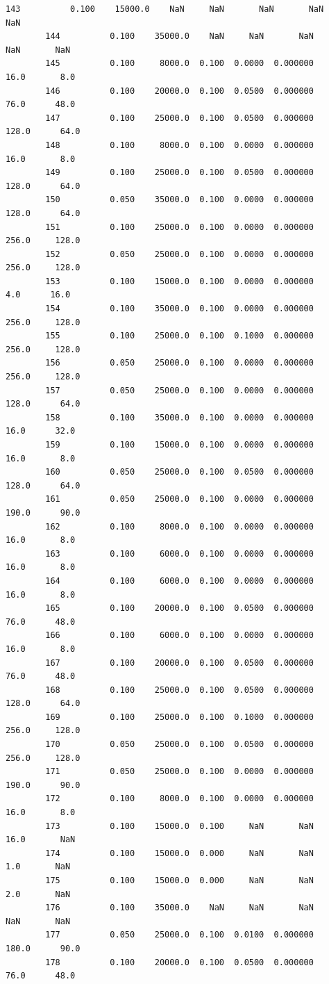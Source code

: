 \documentclass[11pt, a4paper , landscape]{article}
\begin{document}
\begin{Verbatim}[commandchars=\\\{\}]
        143          0.100    15000.0    NaN     NaN       NaN       NaN       NaN   
        144          0.100    35000.0    NaN     NaN       NaN       NaN       NaN   
        145          0.100     8000.0  0.100  0.0000  0.000000      16.0       8.0   
        146          0.100    20000.0  0.100  0.0500  0.000000      76.0      48.0   
        147          0.100    25000.0  0.100  0.0500  0.000000     128.0      64.0   
        148          0.100     8000.0  0.100  0.0000  0.000000      16.0       8.0   
        149          0.100    25000.0  0.100  0.0500  0.000000     128.0      64.0   
        150          0.050    35000.0  0.100  0.0000  0.000000     128.0      64.0   
        151          0.100    25000.0  0.100  0.0000  0.000000     256.0     128.0   
        152          0.050    25000.0  0.100  0.0000  0.000000     256.0     128.0   
        153          0.100    15000.0  0.100  0.0000  0.000000       4.0      16.0   
        154          0.100    35000.0  0.100  0.0000  0.000000     256.0     128.0   
        155          0.100    25000.0  0.100  0.1000  0.000000     256.0     128.0   
        156          0.050    25000.0  0.100  0.0000  0.000000     256.0     128.0   
        157          0.050    25000.0  0.100  0.0000  0.000000     128.0      64.0   
        158          0.100    35000.0  0.100  0.0000  0.000000      16.0      32.0   
        159          0.100    15000.0  0.100  0.0000  0.000000      16.0       8.0   
        160          0.050    25000.0  0.100  0.0500  0.000000     128.0      64.0   
        161          0.050    25000.0  0.100  0.0000  0.000000     190.0      90.0   
        162          0.100     8000.0  0.100  0.0000  0.000000      16.0       8.0   
        163          0.100     6000.0  0.100  0.0000  0.000000      16.0       8.0   
        164          0.100     6000.0  0.100  0.0000  0.000000      16.0       8.0   
        165          0.100    20000.0  0.100  0.0500  0.000000      76.0      48.0   
        166          0.100     6000.0  0.100  0.0000  0.000000      16.0       8.0   
        167          0.100    20000.0  0.100  0.0500  0.000000      76.0      48.0   
        168          0.100    25000.0  0.100  0.0500  0.000000     128.0      64.0   
        169          0.100    25000.0  0.100  0.1000  0.000000     256.0     128.0   
        170          0.050    25000.0  0.100  0.0500  0.000000     256.0     128.0   
        171          0.050    25000.0  0.100  0.0000  0.000000     190.0      90.0   
        172          0.100     8000.0  0.100  0.0000  0.000000      16.0       8.0   
        173          0.100    15000.0  0.100     NaN       NaN      16.0       NaN   
        174          0.100    15000.0  0.000     NaN       NaN       1.0       NaN   
        175          0.100    15000.0  0.000     NaN       NaN       2.0       NaN   
        176          0.100    35000.0    NaN     NaN       NaN       NaN       NaN   
        177          0.050    25000.0  0.100  0.0100  0.000000     180.0      90.0   
        178          0.100    20000.0  0.100  0.0500  0.000000      76.0      48.0   
        

\end{Verbatim}
\end{document}
